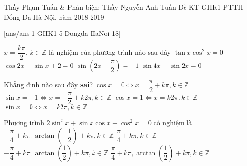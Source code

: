 \begin{name}
{Thầy Phạm Tuấn  \& Phản biện: Thầy Nguyễn Anh Tuấn}
{Đề KT GHK1 PTTH Đống Đa Hà Nội, năm 2018-2019}
\end{name}
\setcounter{ex}{0}
[ans/ans-1-GHK1-5-Dongda-HaNoi-18]
\begin{ex}%
$x=\dfrac{k\pi}{2}$, $k \in \mathbb{Z}$ là nghiệm của phương trình nào sau đây
\choice
{$\tan x \cos^2x=0$}
{$\cos 2x-\sin x+2=0$}
{$\sin \left (2x-\dfrac{\pi}{2}\right )=-1$}
{\True $\sin 4x+\sin 2x =0$}
\end{ex}

\begin{ex}%
Khẳng định nào sau đây \textbf{sai}?
\choice
{$\cos x =0 \Leftrightarrow x= \dfrac{\pi}{2} + k\pi, k \in \mathbb{Z}$}
{$\sin x =-1 \Leftrightarrow x= -\dfrac{\pi}{2} + k2\pi, k \in \mathbb{Z}$}
{$\cos x =1 \Leftrightarrow x= k2\pi, k \in \mathbb{Z}$}
{\True $\sin x =0 \Leftrightarrow x= k2\pi, k \in \mathbb{Z}$}
\end{ex}

\begin{ex}%
Phương trình $2\sin^2x+\sin x \cos x-\cos^2x=0$ có nghiệm là 
\choice
{$-\dfrac{\pi}{4}+k\pi,\arctan \left (-\dfrac{1}{2}\right ) + k\pi, k \in \mathbb{Z} $}
{$\dfrac{\pi}{4}+k\pi, k \in \mathbb{Z} $}
{\True $-\dfrac{\pi}{4}+k\pi,\arctan \left (\dfrac{1}{2}\right ) + k\pi, k \in \mathbb{Z} $}
{$\dfrac{\pi}{4}+k\pi,\arctan \left (\dfrac{1}{2}\right ) + k\pi, k \in \mathbb{Z} $}
\end{ex}

